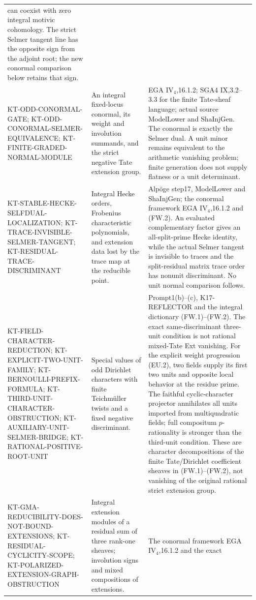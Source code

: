 \begin{longtable}{>{\raggedright\arraybackslash}p{}
>{\raggedright\arraybackslash}p{}
>{\raggedright\arraybackslash}p{}}
can coexist with zero integral motivic cohomology. The strict
Selmer tangent line has the opposite sign from the adjoint
root; the new conormal comparison below retains that sign.\\
KT-ODD-CONORMAL-GATE; KT-ODD-CONORMAL-SELMER-EQUIVALENCE;
KT-FINITE-GRADED-NORMAL-MODULE &
An integral fixed-locus conormal, its weight and involution
summands, and the strict negative Tate extension group. &
EGA IV$_4$,16.1.2; SGA4 IX,3.2--3.3 for the finite Tate-sheaf
language; actual source ModelLower and ShaInjGen.
The conormal is exactly the Selmer dual. A unit minor remains
equivalent to the arithmetic vanishing problem; finite
generation does not supply flatness or a unit determinant.\\
KT-STABLE-HECKE-SELFDUAL-LOCALIZATION;
KT-TRACE-INVISIBLE-SELMER-TANGENT;
KT-RESIDUAL-TRACE-DISCRIMINANT &
Integral Hecke orders, Frobenius characteristic polynomials,
and extension data lost by the trace map at the reducible point. &
Alp\"oge step17, ModelLower and ShaInjGen; the conormal
framework EGA IV$_4$,16.1.2 and (FW.2).
An evaluated complementary factor gives an all-split-prime
Hecke identity, while the actual Selmer tangent is invisible
to traces and the split-residual matrix trace order has
nonunit discriminant. No unit normal comparison follows.\\
KT-FIELD-CHARACTER-REDUCTION; KT-EXPLICIT-TWO-UNIT-FAMILY;
KT-BERNOULLI-PREFIX-FORMULA; KT-THIRD-UNIT-CHARACTER-OBSTRUCTION;
KT-AUXILIARY-UNIT-SELMER-BRIDGE; KT-RATIONAL-POSITIVE-ROOT-UNIT &
Special values of odd Dirichlet characters with finite
Teichm\"uller twists and a fixed negative discriminant. &
Prompt1(b)--(c), K17-REFLECTOR and the integral dictionary
(FW.1)--(FW.2). The exact same-discriminant three-unit
condition is not rational mixed-Tate Ext vanishing.
For the explicit weight progression (EU.2), two fields
supply its first two units and opposite local behavior
at the residue prime. The faithful cyclic-character projector
annihilates all units imported from multiquadratic fields; full
compositum $p$-rationality is stronger than the third-unit condition.
These are character decompositions of the finite Tate/Dirichlet
coefficient sheaves in (FW.1)--(FW.2), not vanishing of the
original rational strict extension group.\\
KT-GMA-REDUCIBILITY-DOES-NOT-BOUND-EXTENSIONS;
KT-RESIDUAL-CYCLICITY-SCOPE;
KT-POLARIZED-EXTENSION-GRAPH-OBSTRUCTION &
Integral extension modules of a residual sum of three
rank-one sheaves; involution signs and mixed compositions
of extensions. &
The conormal framework EGA IV$_4$,16.1.2 and the exact

\end{longtable}
